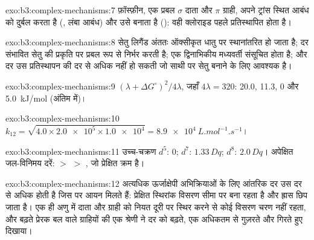 \begin{solution}{exo:b3:complex-mechanisms:7}
फ़ॉस्फ़ीन, एक प्रबल $\sigma$ दाता और $\pi$ ग्राही, अपने ट्रांस स्थित आबंध को दुर्बल करता है (, लंबा आबंध) और उसे  बनाता है (): वही क्लोराइड
पहले प्रतिस्थापित होता है।
\end{solution}

\begin{solution}{exo:b3:complex-mechanisms:8}
सेतु लिगैंड अंततः ऑक्सीकृत धातु पर स्थानांतरित हो जाता है; दर संभावित सेतु की
प्रकृति पर प्रबल रूप से निर्भर करती है; एक द्विनाभिकीय मध्यवर्ती
संसूचित होता है; और दर उस प्रतिस्थापन की दर से अधिक नहीं हो सकती जो
 साथी पर सेतु बनाने के लिए आवश्यक है।
\end{solution}

\begin{solution}{exo:b3:complex-mechanisms:9}
$(\lambda + \Delta G^\circ)^2/4\lambda$, जहाँ $4\lambda = 320$: 20.0, 11.3, 0 और \qty{5.0}{kJ/mol} (अंतिम  में)।
\end{solution}

\begin{solution}{exo:b3:complex-mechanisms:10}
$k_{12} = \sqrt{4.0 \times \num{2.0e5} \times \num{1.0e4}} = \qty{8.9e4}{L.mol^{-1}.s^{-1}}$।
\end{solution}

\begin{solution}{exo:b3:complex-mechanisms:11}
उच्च-चक्रण $d^5$: 0; $d^7$: $1.33\,Dq$; $d^8$: $2.0\,Dq$। अपेक्षित जल-विनिमय दरें:  $>$  $>$
, जो प्रेक्षित क्रम है।
\end{solution}

\begin{solution}{exo:b3:complex-mechanisms:12}
अत्यधिक ऊर्जाक्षेपी अभिक्रियाओं के लिए आंतरिक दर उस दर से अधिक होती है जिस पर आयन
मिलते हैं: प्रेक्षित स्थिरांक विसरण सीमा पर बना रहता है और ह्रास
छिप जाता है। एक ही अणु में दाता और ग्राही को नियत दूरी पर स्थिर करने से
कोई विसरण चरण नहीं रहता, और बढ़ते प्रेरक बल वाले ग्राहियों की एक श्रेणी ने
दर को बढ़ते, एक अधिकतम से गुज़रते और गिरते हुए दिखाया।
\end{solution}

